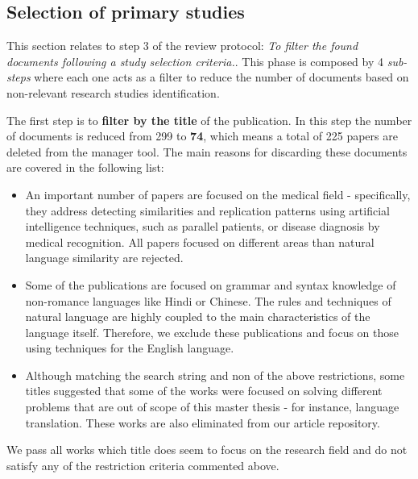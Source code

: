\subsection{Selection of primary studies}

This section relates to step 3 of the review protocol: \textit{To filter the found documents following a study selection criteria.}. This phase is composed by 4 \textit{sub-steps} where each one acts as a filter to reduce the number of documents based on non-relevant research studies identification.

The first step is to \textbf{filter by the title} of the publication. In this step the number of documents is reduced from 299 to \textbf{74}, which means a total of 225 papers are deleted from the manager tool. The main reasons for discarding these documents are covered in the following list:
\begin{itemize}
\item An important number of papers are focused on the medical field - specifically, they address detecting similarities and replication patterns using artificial intelligence techniques, such as parallel patients, or disease diagnosis by medical recognition. All papers focused on different areas than natural language similarity are rejected.
\item Some of the publications are focused on grammar and syntax knowledge of non-romance languages like Hindi or Chinese. The rules and techniques of natural language are highly coupled to the main characteristics of the language itself. Therefore, we exclude these publications and focus on those using techniques for the English language.
\item Although matching the search string and non of the above restrictions, some titles suggested that some of the works were focused on solving different problems that are out of scope of this master thesis - for instance, language translation. These works are also eliminated from our article repository.
\end{itemize}

We pass all works which title does seem to focus on the research field and do not satisfy any of the restriction criteria commented above.

